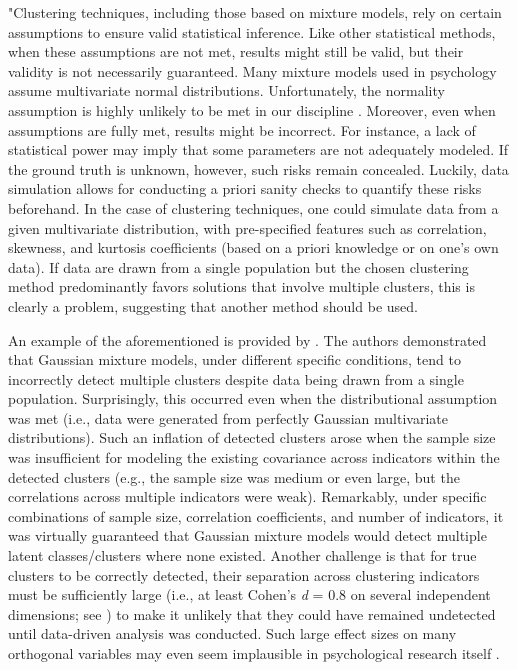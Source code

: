 \documentclass[letterpaper,11pt]{article}
\begin{document}
"Clustering techniques, including those based on mixture models, rely on certain assumptions to ensure valid statistical inference. Like other statistical methods, when these assumptions are not met, results might still be valid, but their validity is not necessarily guaranteed. Many mixture models used in psychology assume multivariate normal distributions. Unfortunately, the normality assumption is highly unlikely to be met in our discipline \cite{micceri1989unicorn}. Moreover, even when assumptions are fully met, results might be incorrect. For instance, a lack of statistical power may imply that some parameters are not adequately modeled. If the ground truth is unknown, however, such risks remain concealed. Luckily, data simulation allows for conducting a priori sanity checks to quantify these risks beforehand. In the case of clustering techniques, one could simulate data from a given multivariate distribution, with pre-specified features such as correlation, skewness, and kurtosis coefficients (based on a priori knowledge or on one's own data). If data are drawn from a single population but the chosen clustering method predominantly favors solutions that involve multiple clusters, this is clearly a problem, suggesting that another method should be used.

An example of the aforementioned is provided by . The authors demonstrated that Gaussian mixture models, under different specific conditions, tend to incorrectly detect multiple clusters despite data being drawn from a single population. Surprisingly, this occurred even when the distributional assumption was met (i.e., data were generated from perfectly Gaussian multivariate distributions). Such an inflation of detected clusters arose when the sample size was insufficient for modeling the existing covariance across indicators within the detected clusters (e.g., the sample size was medium or even large, but the correlations across multiple indicators were weak). Remarkably, under specific combinations of sample size, correlation coefficients, and number of indicators, it was virtually guaranteed that Gaussian mixture models would detect multiple latent classes/clusters where none existed. Another challenge is that for true clusters to be correctly detected, their separation across clustering indicators must be sufficiently large (i.e., at least Cohen’s \textit{d} = 0.8 on several independent dimensions; see ) to make it unlikely that they could have remained undetected until data-driven analysis was conducted. Such large effect sizes on many orthogonal variables may even seem implausible in psychological research itself \cite{toffalini2022entia}.
\end{document}
